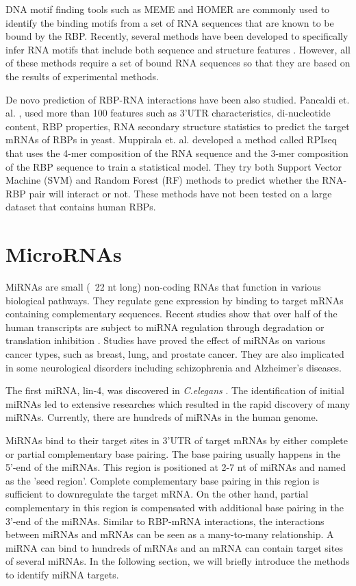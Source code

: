 DNA motif finding tools such as MEME \cite{bailey_06} and HOMER \cite{heinz_2010} are commonly used to identify the binding motifs from a set of RNA sequences that are known to be bound by the RBP. Recently, several methods have been developed to specifically infer RNA motifs that include both sequence and structure features \cite{kazan_10, hiller_06, maticzka_14}. However, all of these methods require a set of bound RNA sequences so that they are based on the results of experimental methods.

De novo prediction of RBP-RNA interactions have been also studied. Pancaldi et. al. \cite{pancaldi_2012}, used more than 100 features such as 3’UTR characteristics, di-nucleotide content, RBP properties, RNA secondary structure statistics to predict the target mRNAs of RBPs in yeast. Muppirala et. al. \cite{muppirala_2011} developed a method called RPIseq that uses the 4-mer composition of the RNA sequence and the 3-mer composition of the RBP sequence to train a statistical model. They try both Support Vector Machine (SVM) and Random Forest (RF) methods to predict whether the RNA-RBP pair will interact or not. These methods have not been tested on a large dataset that contains human RBPs. 


\section{MicroRNAs}

MiRNAs are small (~22 nt long) non-coding RNAs that function in various biological pathways. They regulate gene expression by binding to target mRNAs containing complementary sequences. Recent studies show that over half of the human transcripts are subject to miRNA regulation through degradation or translation inhibition \cite{bartel_2009}. Studies have proved the effect of miRNAs on various cancer types, such as breast, lung, and prostate cancer. They are also implicated in some neurological disorders including schizophrenia and Alzheimer's diseases.

The first miRNA, lin-4, was discovered in \textit{C.elegans} \cite{lee_1993}. The identification of initial miRNAs led to extensive researches which resulted in the rapid discovery of many miRNAs. Currently, there are hundreds of miRNAs in the human genome.

MiRNAs bind to their target sites in 3'UTR of target mRNAs by either complete or partial complementary base pairing. The base pairing usually happens in the 5'-end of the miRNAs. This region is positioned at 2-7 nt of miRNAs and named as the 'seed region'. Complete complementary base pairing in this region is sufficient to downregulate the target mRNA. On the other hand, partial complementary in this region is compensated with additional base pairing in the 3'-end of the miRNAs. Similar to RBP-mRNA interactions, the interactions between miRNAs and mRNAs can be seen as a many-to-many relationship. A miRNA can bind to hundreds of mRNAs and an mRNA can contain target sites of several miRNAs. In the following section, we will briefly introduce the methods to identify miRNA targets.


